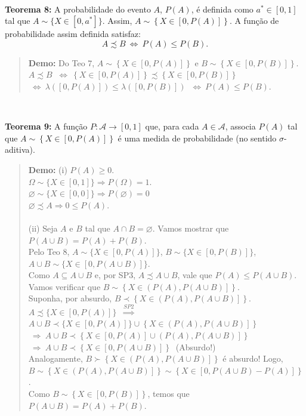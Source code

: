 \documentclass[
]{book}
\begin{document}
\(~\)

\textbf{Teorema 8:} A probabilidade do evento \(A\), \(P(A)\), é definida como \(a^* \in [0,1]\) tal que \(A \sim \{X \in [0,a^*]\}\). Assim, \(A \sim \left\{X \in \left[0,P(A)\right]\right\}\). A função de probabilidade assim definida satisfaz:
\[A \precsim B ~\Leftrightarrow~ P(A) \leq P(B).\]

\begin{quote}
\textbf{Demo:} Do Teo 7, \(A \sim \left\{X \in \left[0,P(A)\right]\right\}\) e \(B \sim \left\{X \in \left[0,P(B)\right]\right\}\).\\
\(A \precsim B\) \(~\Leftrightarrow~ \left\{X \in \left[0,P(A)\right]\right\} \precsim \left\{X \in \left[0,P(B)\right]\right\}\) \(~\Leftrightarrow~ \lambda \left([0,P(A)]\right) \leq \lambda \left([0,P(B)]\right)\) \(~\Leftrightarrow~ P(A) \leq P(B).\)
\end{quote}

\(~\)

\textbf{Teorema 9:} A função \(P: \mathcal{A} \longrightarrow [0,1]\) que, para cada \(A \in \mathcal{A}\), associa \(P(A)\) tal que \(A \sim \left\{X \in \left[0,P(A)\right]\right\}\) é uma medida de probabilidade (no sentido \(\sigma\)-aditiva).

\begin{quote}
\textbf{Demo:}
(i) \(P(A) \geq 0\).\\
\(\Omega \sim \{X \in [0,1]\}\Rightarrow P(\Omega)=1\).\\
\(\varnothing \sim \{X \in [0,0]\} \Rightarrow P(\varnothing)=0\)\\
\(\varnothing \precsim A \Rightarrow 0 \leq P(A)\).\\
\(~\)\\
(ii) Seja \(A\) e \(B\) tal que \(A \cap B = \varnothing\). Vamos mostrar que \(P(A \cup B) = P(A) + P(B)\).\\
Pelo Teo 8, \(A \sim \{ X \in [0,P(A)]\}\), \(B \sim \{ X \in [0,P(B)]\}\), \(A \cup B \sim \{ X \in [0,P(A \cup B)]\}\).\\
Como \(A \subseteq A \cup B\) e, por SP3, \(A \precsim A \cup B\), vale que \(P(A) \leq P(A \cup B)\). Vamos verificar que \(B \sim \left\{X \in \left(P(A),P(A \cup B) \right]\right\}\).\\
Suponha, por absurdo, \(B \prec \left\{X \in \left(P(A),P(A \cup B) \right]\right\}\).\\
\(A \precsim \{X \in [0,P(A)]\}\) \(~\overset{SP2}{\Longrightarrow}~\)
\(A \cup B \prec \{X \in [0,P(A)]\} \cup \left\{X \in \left(P(A),P(A \cup B) \right]\right\}\)
\(~\Rightarrow~ A \cup B \prec \left\{X \in [0,P(A)] \cup \left(P(A),P(A \cup B) \right]\right\}\)
\(~\Rightarrow~ A \cup B \prec \left\{X \in \left[0,P(A \cup B) \right]\right\}~\) (Absurdo!)\\
Analogamente, \(B \succ \left\{X \in \left(P(A),P(A \cup B) \right]\right\}\) é absurdo! Logo, \(B \sim \left\{X \in \left(P(A),P(A \cup B) \right]\right\} \sim \left\{X \in \left[0, P(A \cup B)-P(A) \right]\right\}\).\\
Como \(B \sim \left\{X \in \left[0,P(B)\right]\right\}\), temos que \(P(A \cup B) = P(A) + P(B)\).
\end{quote}
\end{document}
